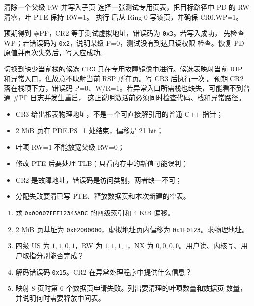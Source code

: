 \begin{faultinjectionbox}{清除一个父级 RW 并写入子页}
选择一张测试专用页表，把目标路径中 PD 的 RW 清零，叶 PTE 保持 RW=1。
执行  后从 Ring 0 写该页，并确保 CR0.WP=1。

预期得到 \#PF，CR2 等于测试虚拟地址，错误码为 \texttt{0x3}。若写入成功，
先检查 WP；若错误码为 \texttt{0x2}，说明某级 P=0，测试没有到达只读权限
检查。恢复 PD 原值并再次失效后，写入应成功。
\end{faultinjectionbox}

\begin{faultinjectionbox}{切换到缺少当前栈的候选 CR3}
只在专用故障镜像中进行。候选表映射当前 RIP 和异常入口，但故意不映射当前
RSP 所在页。写 CR3 后执行一次 。预期 CR2 落在栈顶下方，错误码
P=0、W/R=1。若异常入口所需栈也缺失，可能看不到普通 \#PF 日志并发生重启，
这正说明激活前必须同时检查代码、栈和异常路径。
\end{faultinjectionbox}

\begin{pitfallbox}
\begin{itemize}[leftmargin=2.2em]
  \item CR3 给出根表物理地址，不是一个可直接解引用的普通 C++ 指针；
  \item 2 MiB 页在 PDE.PS=1 处结束，偏移是 21 bit；
  \item 叶项 RW=1 不能放宽父级 RW=0；
  \item 修改 PTE 后要处理 TLB；只看内存中的新值可能误判；
  \item CR2 是故障地址，错误码是访问类别，两者缺一不可；
  \item 分配失败要清已写 PTE、释放数据页和本次新建的空表。
\end{itemize}
\end{pitfallbox}


\begin{enumerate}[leftmargin=2.2em]
  \item 求 \texttt{0x00007FFF12345ABC} 的四级索引和 4 KiB 偏移。
  \item 2 MiB 页基址为 \texttt{0x02000000}，虚拟地址页内偏移为
    \texttt{0x1F0123}。求物理地址。
  \item 四级 US 为 \(1,1,0,1\)，RW 为 \(1,1,1,1\)，NX 为
    \(0,0,0,0\)。用户读、内核写、用户取指分别能否完成？
  \item 解码错误码 \texttt{0x15}。CR2 在异常处理程序中提供什么信息？
  \item 映射 8 页时第 6 个数据页申请失败。列出要清理的叶项数量和数据页
    数量，并说明何时需要释放中间表。
\end{enumerate}

